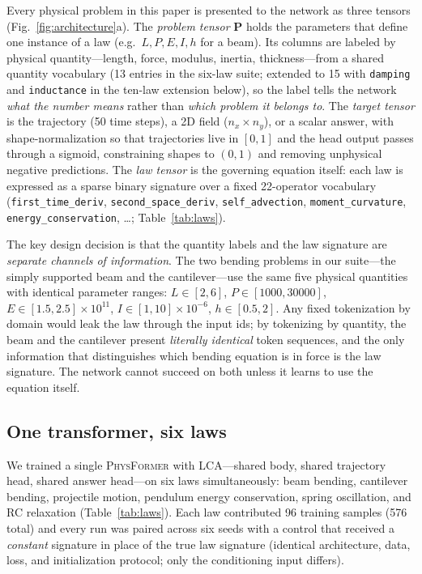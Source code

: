 \documentclass[11pt,a4paper]{article}
\newcommand{\PT}{{\scshape PhysFormer}}
\newcommand{\LCA}{{\scshape LCA}}
\begin{document}
Every physical problem in this paper is presented to the network as three
tensors (Fig.~\ref{fig:architecture}a). The \emph{problem tensor}
$\mathbf{P}$ holds the parameters that define one instance of a law
(e.g.\ $L, P, E, I, h$ for a beam). Its columns are labeled by physical
quantity---length, force, modulus, inertia, thickness---from a shared
quantity vocabulary (13 entries in the six-law suite; extended to 15 with
\texttt{damping} and \texttt{inductance} in the ten-law extension below), so
the label tells the network \emph{what the number means} rather than
\emph{which problem it belongs to}. The
\emph{target tensor} is the trajectory (50 time steps), a 2D field
($n_x \times n_y$), or a scalar answer, with shape-normalization so that
trajectories live in $[0,1]$ and the head output passes through a sigmoid,
constraining shapes to $(0,1)$ and removing unphysical negative predictions.
The \emph{law tensor} is the governing equation itself: each law is expressed
as a sparse binary signature over a fixed 22-operator vocabulary
(\texttt{first\_time\_deriv}, \texttt{second\_space\_deriv},
\texttt{self\_advection}, \texttt{moment\_curvature},
\texttt{energy\_conservation}, \ldots; Table~\ref{tab:laws}).

The key design decision is that the quantity labels and the law signature are
\emph{separate channels of information}. The two bending problems in our
suite---the simply supported beam and the cantilever---use the same five
physical quantities with identical parameter ranges: $L \in [2,6]$, $P \in
[1000,30000]$, $E \in [1.5,2.5]\times10^{11}$, $I \in [1,10]\times10^{-6}$,
$h \in [0.5,2]$. Any fixed tokenization by domain would leak the law through
the input ids; by tokenizing by quantity, the beam and the cantilever present
\emph{literally identical} token sequences, and the only information that
distinguishes which bending equation is in force is the law signature. The
network cannot succeed on both unless it learns to use the equation itself.

\subsection{One transformer, six laws}
\label{sec:multilaw}

We trained a single \PT{} with \LCA{}---shared body, shared trajectory head,
shared answer head---on six laws simultaneously: beam bending, cantilever
bending, projectile motion, pendulum energy conservation, spring
oscillation, and RC relaxation (Table~\ref{tab:laws}). Each law contributed
96 training samples (576 total) and every run was paired across six seeds with
a control that received a \emph{constant} signature in place of the true law
signature (identical architecture, data, loss, and initialization protocol;
only the conditioning input differs).
\end{document}
